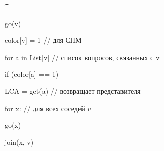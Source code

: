          \t{\begin{MyList}
          \item \hspace{0em} go(v)
          \item \hspace{2em}  color[v] = 1 // для СНМ
          \item \hspace{2em}  for a in List[v] // список вопросов, связанных с v
          \item \hspace{4em}  if (color[a] == 1)
          \item \hspace{6em}   LCA = get(a) // возвращает представителя
          \item \hspace{2em}  for x: // для всех соседей $v$
          \item \hspace{4em}  go(x)
          \item \hspace{4em}  join(x, v)
        \end{MyList}}

